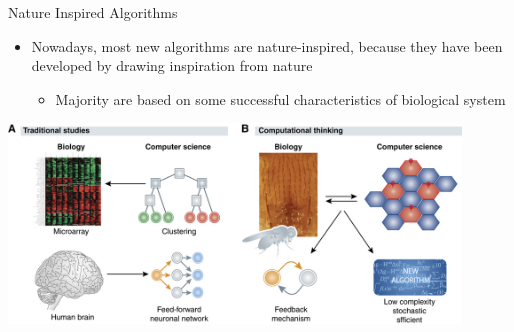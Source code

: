 \begin{frame}[c]{Nature Inspired Algorithms}
\begin{itemize}
	\item Nowadays, most new algorithms are nature-inspired, because they have been developed by drawing inspiration from nature
	\begin{itemize}
	    \item Majority are based on some successful characteristics of biological system
	\end{itemize}
\end{itemize}
\centering
\includegraphics[width=0.9\textwidth]{new_images/nature-inspired.jpg}


\end{frame}


